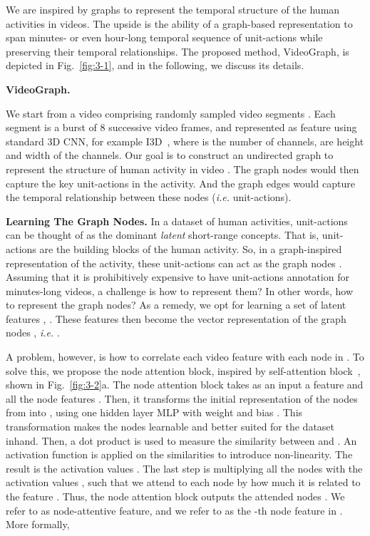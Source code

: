 \documentclass[10pt,twocolumn,letterpaper]{article}
\newcommand{\partitle}[1]{\noindent\textbf{#1}}
\newcommand{\ptspace}{\vspace*{5pt}}
\begin{document}
We are inspired by graphs to represent the temporal structure of the human activities in videos.
The upside is the ability of a graph-based representation to span minutes- or even hour-long temporal sequence of unit-actions while preserving their temporal relationships.
The proposed method, VideoGraph, is depicted in Fig.~\ref{fig:3-1}, and in the following, we discuss its details.

\ptspace
\partitle{VideoGraph.}

We start from a video  comprising  randomly sampled video segments .
Each segment  is a burst of 8 successive video frames, and represented as feature  using standard 3D CNN, for example I3D~\cite{carreira2017quo}, where  is the number of channels,  are height and width of the channels.
Our goal is to construct an undirected graph  to represent the structure of human activity in video .
The graph nodes  would then capture the key unit-actions in the activity.
And the graph edges  would capture the temporal relationship between these nodes (\textit{i.e.}  unit-actions).

\ptspace
\partitle{Learning The Graph Nodes.}
In a dataset of human activities, unit-actions can be thought of as the dominant {\em latent} short-range concepts.
That is, unit-actions are the building blocks of the human activity.
So, in a graph-inspired representation of the activity, these unit-actions can act as the graph nodes .
Assuming that it is prohibitively expensive to have unit-actions annotation for minutes-long videos, a challenge is how to represent them?
In other words, how to represent the graph nodes?
As a remedy, we opt for learning a set of  latent features , .
These features  then become the vector representation of the graph nodes , \textit{i.e.} .

A problem, however, is how to correlate each video feature  with each node in .
To solve this, we propose the node attention block, inspired by self-attention block~\cite{wang2017non, vaswani2017attention, girdhar2018video}, shown in Fig.~\ref{fig:3-2}{\color{red}a}.
The node attention block takes as an input a feature  and all the node features .
Then, it transforms the initial representation of the nodes from  into , using one hidden layer MLP with weight and bias .
This transformation makes the nodes learnable and better suited for the dataset inhand.
Then, a dot product  is used to measure the similarity between  and .
An activation function  is applied on the similarities to introduce non-linearity.
The result is the activation values .
The last step is multiplying all the nodes  with the activation values , such that we attend to each node  by how much it is related to the feature .
Thus, the node attention block outputs the attended nodes . We refer to  as node-attentive feature, and we refer to  as the -th node feature in . More formally,
\end{document}
